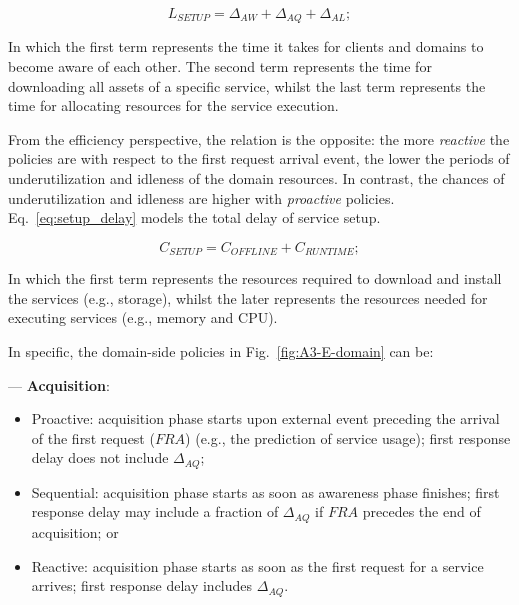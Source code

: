 \begin{equation}\label{eq:setup_delay}
L_{SETUP} = \Delta_{AW} + \Delta_{AQ} + \Delta_{AL};
\end{equation}


\noindent
In which the first term represents the time it takes for clients and domains to become aware of each other. The second term represents the time for downloading all assets of a specific service, whilst the last term represents the time for allocating resources for the service execution. 

From the efficiency perspective, the relation is the opposite: the more \textit{reactive} the policies are with respect to the first request arrival event, the lower the periods of underutilization and idleness of the domain resources. In contrast, the chances of underutilization and idleness are higher with \textit{proactive} policies. Eq.~\ref{eq:setup_delay} models the total delay of service setup. 

\begin{equation}\label{eq:setup_cost}
C_{SETUP} = C_{OFFLINE} + C_{RUNTIME};
\end{equation}

\noindent
In which the first term represents the resources required to download and install the services (e.g., storage), whilst the later represents the resources needed for executing services (e.g., memory and CPU).

In specific, the domain-side policies in Fig.~\ref{fig:A3-E-domain} can be:
\medskip
\medskip


--- \textbf{Acquisition}:

\begin{itemize}

\item Proactive: acquisition phase starts upon external event preceding the arrival of the first request ($FRA$) (e.g., the prediction of service usage); first response delay does not include $\Delta_{AQ}$;

\item Sequential: acquisition phase starts as soon as awareness phase finishes; first response delay may include a fraction of $\Delta_{AQ}$ if $FRA$ precedes the end of acquisition; or

\item Reactive: acquisition phase starts as soon as the first request for a service arrives; first response delay includes $\Delta_{AQ}$.

\end{itemize}

